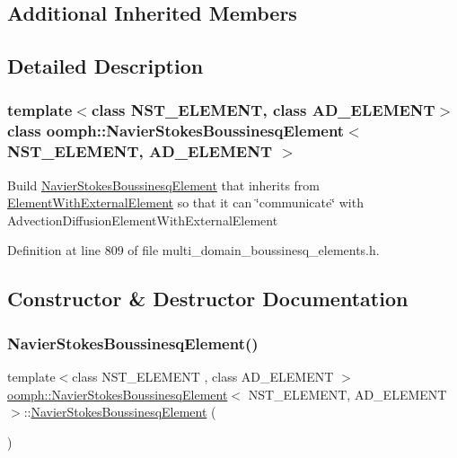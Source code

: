 \subsection*{Additional Inherited Members}


\subsection{Detailed Description}
\subsubsection*{template$<$class N\+S\+T\+\_\+\+E\+L\+E\+M\+E\+NT, class A\+D\+\_\+\+E\+L\+E\+M\+E\+NT$>$\newline
class oomph\+::\+Navier\+Stokes\+Boussinesq\+Element$<$ N\+S\+T\+\_\+\+E\+L\+E\+M\+E\+N\+T, A\+D\+\_\+\+E\+L\+E\+M\+E\+N\+T $>$}

Build \hyperlink{classoomph_1_1NavierStokesBoussinesqElement}{Navier\+Stokes\+Boussinesq\+Element} that inherits from \hyperlink{classoomph_1_1ElementWithExternalElement}{Element\+With\+External\+Element} so that it can \char`\"{}communicate\char`\"{} with Advection\+Diffusion\+Element\+With\+External\+Element 

Definition at line 809 of file multi\+\_\+domain\+\_\+boussinesq\+\_\+elements.\+h.



\subsection{Constructor \& Destructor Documentation}
\mbox{\label{classoomph_1_1NavierStokesBoussinesqElement_ad0ebb74a3963c0715e6e3e34ba8b1d7f}} 
\subsubsection{\texorpdfstring{Navier\+Stokes\+Boussinesq\+Element()}{NavierStokesBoussinesqElement()}}
{\footnotesize\ttfamily template$<$class N\+S\+T\+\_\+\+E\+L\+E\+M\+E\+NT , class A\+D\+\_\+\+E\+L\+E\+M\+E\+NT $>$ \\
\hyperlink{classoomph_1_1NavierStokesBoussinesqElement}{oomph\+::\+Navier\+Stokes\+Boussinesq\+Element}$<$ N\+S\+T\+\_\+\+E\+L\+E\+M\+E\+NT, A\+D\+\_\+\+E\+L\+E\+M\+E\+NT $>$\+::\hyperlink{classoomph_1_1NavierStokesBoussinesqElement}{Navier\+Stokes\+Boussinesq\+Element} (\begin{DoxyParamCaption}{ }\end{DoxyParamCaption})\hspace{0.3cm}{\ttfamily [inline]}}



